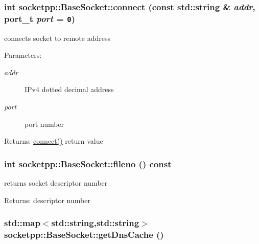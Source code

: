\begin{CompactItemize}
{\subsubsection[{connect}]{\setlength{\rightskip}{0pt plus 5cm}int socketpp::BaseSocket::connect (const std::string \& {\em addr}, \/  {\bf port\_\-t} {\em port} = {\tt 0})}}
\label{classsocketpp_1_1BaseSocket_769710192256606aaec1a776468d75fa}


connects socket to remote address 

\begin{Desc}
\item[Parameters:]
\begin{description}
\item[{\em addr}]IPv4 dotted decimal address \item[{\em port}]port number \end{description}
\end{Desc}
\begin{Desc}
\item[Returns:]\hyperlink{classsocketpp_1_1BaseSocket_769710192256606aaec1a776468d75fa}{connect()} return value \end{Desc}
\hypertarget{classsocketpp_1_1BaseSocket_c96db07cc917926d895d89cf73734ea1}{
\subsubsection[{fileno}]{\setlength{\rightskip}{0pt plus 5cm}int socketpp::BaseSocket::fileno () const}}
\label{classsocketpp_1_1BaseSocket_c96db07cc917926d895d89cf73734ea1}


returns socket descriptor number 

\begin{Desc}
\item[Returns:]descriptor number \end{Desc}
\hypertarget{classsocketpp_1_1BaseSocket_52bf8df48bf4da48eff4adc690caa211}{
\subsubsection[{getDnsCache}]{\setlength{\rightskip}{0pt plus 5cm}std::map$<$std::string,std::string$>$ socketpp::BaseSocket::getDnsCache ()}}
\label{classsocketpp_1_1BaseSocket_52bf8df48bf4da48eff4adc690caa211}



\end{CompactItemize}
